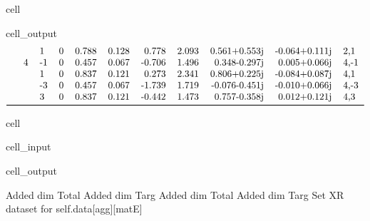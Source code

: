 \documentclass[letterpaper,table,10pt,english]{jupyterBook}
\begin{document}
\begin{sphinxuseclass}{cell}
\begin{sphinxVerbatimOutput}
\begin{sphinxuseclass}{cell_output}
\begin{equation*}
\begin{split}
\begin{tabular}{llllrrrrrrl}
    &   &  1 &  0 &  0.788 &  0.128 &  0.778 &  2.093 &  0.561+0.553j & -0.064+0.111j &    2,1 \\
    & 4 & -1 &  0 &  0.457 &  0.067 & -0.706 &  1.496 &  0.348-0.297j &  0.005+0.066j &   4,-1 \\
    &   &  1 &  0 &  0.837 &  0.121 &  0.273 &  2.341 &  0.806+0.225j & -0.084+0.087j &    4,1 \\
    &   & -3 &  0 &  0.457 &  0.067 & -1.739 &  1.719 & -0.076-0.451j & -0.010+0.066j &   4,-3 \\
    &   &  3 &  0 &  0.837 &  0.121 & -0.442 &  1.473 &  0.757-0.358j &  0.012+0.121j &    4,3 \\
\bottomrule
\end{tabular}\end{split}
\end{equation*}
\end{sphinxuseclass}\end{sphinxVerbatimOutput}

\end{sphinxuseclass}
\begin{sphinxuseclass}{cell}\begin{sphinxVerbatimInput}

\begin{sphinxuseclass}{cell_input}
\begin{sphinxVerbatim}[commandchars=\\\{\}]
         
\end{sphinxVerbatim}

\end{sphinxuseclass}\end{sphinxVerbatimInput}
\begin{sphinxVerbatimOutput}

\begin{sphinxuseclass}{cell_output}
\begin{sphinxVerbatim}[commandchars=\\\{\}]
Added dim Total
Added dim Targ
Added dim Total
Added dim Targ
Set XR dataset for self.data[\PYGZsq{}agg\PYGZsq{}][\PYGZsq{}matE\PYGZsq{}]
\end{sphinxVerbatim}

\end{sphinxuseclass}\end{sphinxVerbatimOutput}

\end{sphinxuseclass}
\end{document}
